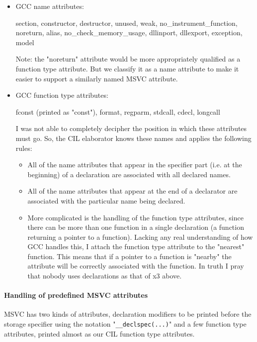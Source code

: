 \documentclass[letterpaper]{article}
\def\t#1{{\tt #1}}
\begin{document}
\begin{itemize}
  \item GCC name attributes:
   
   section, constructor, destructor, unused, weak, no\_instrument\_function,
   noreturn, alias, no\_check\_memory\_usage, dllinport, dllexport, exception,
   model

      Note: the "noreturn" attribute would be more appropriately qualified as a
      function type attribute. But we classify it as a name attribute to make
      it easier to support a similarly named MSVC attribute. 
  
  \item GCC function type attributes:

    fconst (printed as "const"), format, regparm, stdcall,
    cdecl, longcall

  I was not able to completely decipher the position in which these attributes
  must go. So, the CIL elaborator knows these names and applies the following
  rules: 
  \begin{itemize}
  \item All of the name attributes that appear in the specifier part (i.e. at
  the beginning) of a declaration are associated with all declared names. 

  \item All of the name attributes that appear at the end of a declarator are
  associated with the particular name being declared.

  \item More complicated is the handling of the function type attributes, since
     there can be more than one function in a single declaration (a function
     returning a pointer to a function). Lacking any real understanding of how
     GCC handles this, I attach the function type attribute to the "nearest"
     function. This means that if a pointer to a function is "nearby" the
     attribute will be correctly associated with the function. In truth I pray
     that nobody uses declarations as that of x3 above. 
  \end{itemize}
\end{itemize}

\paragraph{Handling of predefined MSVC attributes}

  MSVC has two kinds of attributes, declaration modifiers to be printed before
  the storage specifier using the notation "\t{\_\_declspec(...)}" and a few
  function type attributes, printed almost as our CIL function type
  attributes. 
\end{document}
